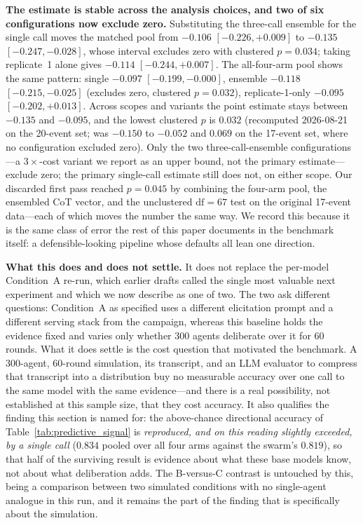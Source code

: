 \documentclass[11pt,journal,onecolumn]{IEEEtran}
\begin{document}
\textbf{The estimate is stable across the analysis choices, and two of six configurations now exclude zero.} Substituting the three-call ensemble for the single call moves the matched pool from $-0.106$ $[-0.226, +0.009]$ to $-0.135$ $[-0.247, -0.028]$, whose interval excludes zero with clustered $p = 0.034$; taking replicate~1 alone gives $-0.114$ $[-0.244, +0.007]$. The all-four-arm pool shows the same pattern: single $-0.097$ $[-0.199, -0.000]$, ensemble $-0.118$ $[-0.215, -0.025]$ (excludes zero, clustered $p = 0.032$), replicate-1-only $-0.095$ $[-0.202, +0.013]$. Across scopes and variants the point estimate stays between $-0.135$ and $-0.095$, and the lowest clustered $p$ is $0.032$ (recomputed 2026-08-21 on the 20-event set; was $-0.150$ to $-0.052$ and $0.069$ on the 17-event set, where no configuration excluded zero). Only the two three-call-ensemble configurations---a $3\times$-cost variant we report as an upper bound, not the primary estimate---exclude zero; the primary single-call estimate still does not, on either scope. Our discarded first pass reached $p = 0.045$ by combining the four-arm pool, the ensembled CoT vector, and the unclustered $\mathrm{df}=67$ test on the original 17-event data---each of which moves the number the same way. We record this because it is the same class of error the rest of this paper documents in the benchmark itself: a defensible-looking pipeline whose defaults all lean one direction.

\textbf{What this does and does not settle.} It does not replace the per-model Condition~A re-run, which earlier drafts called the single most valuable next experiment and which we now describe as one of two. The two ask different questions: Condition~A as specified uses a different elicitation prompt and a different serving stack from the campaign, whereas this baseline holds the evidence fixed and varies only whether $300$ agents deliberate over it for $60$ rounds. What it does settle is the cost question that motivated the benchmark. A $300$-agent, $60$-round simulation, its transcript, and an LLM evaluator to compress that transcript into a distribution buy no measurable accuracy over one call to the same model with the same evidence---and there is a real possibility, not established at this sample size, that they cost accuracy. It also qualifies the finding this section is named for: the above-chance directional accuracy of Table~\ref{tab:predictive_signal} is \emph{reproduced, and on this reading slightly exceeded, by a single call} ($0.834$ pooled over all four arms against the swarm's $0.819$), so that half of the surviving result is evidence about what these base models know, not about what deliberation adds. The B-versus-C contrast is untouched by this, being a comparison between two simulated conditions with no single-agent analogue in this run, and it remains the part of the finding that is specifically about the simulation.
\end{document}
